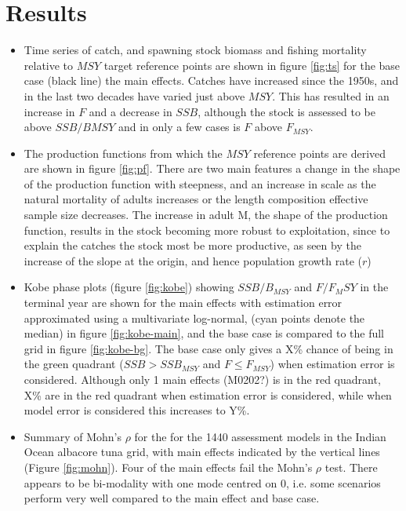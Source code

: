 \section*{Results}

\begin{itemize}
   \item Time series of catch, and spawning stock biomass and fishing mortality relative to $MSY$ target reference points are shown in figure \ref{fig:ts} for the base case (black line) the main effects. Catches have increased since the 1950s, and in the last two decades have varied just above $MSY$. This has resulted in an increase in $F$ and a decrease in $SSB$, although the stock is assessed to be above $SSB/B{MSY}$ and in only a few cases is $F$ above $F_{MSY}$.  

   \item The production functions from which the $MSY$ reference points are derived are shown in figure \ref{fig:pf}. There are two main features a change in the shape of the production function with steepness, and an increase in scale as the natural mortality of adults increases or the length composition effective sample size decreases. The increase in adult M, the shape of the production function, results in the stock becoming more robust to exploitation, since to explain the catches the stock most be more productive, as seen by the increase of the slope at the origin, and hence population growth rate ($r$)  

   \item Kobe phase plots (figure \ref{fig:kobe}) showing $SSB/B_{MSY}$ and $F/F_MSY$ in the terminal year are shown for the main effects with estimation error approximated using a multivariate log-normal, (cyan points denote the median) in figure \ref{fig:kobe-main}, and the base case is compared to the full grid in figure \ref{fig:kobe-bg}. The base case only gives a X\% chance of being in the green quadrant ($SSB \gt SSB_{MSY}$ and $F \le F_{MSY}$) when estimation error is considered. Although only 1 main effects (M0202?) is in the red quadrant, X\% are in the red quadrant when estimation error is considered, while when model error is considered this increases to Y\%. 
   
   \item Summary of Mohn's $\rho$ for the for the 1440 assessment models in the Indian Ocean albacore tuna grid, with main effects indicated by the vertical lines (Figure \ref{fig:mohn}). Four of the main effects fail the Mohn's $\rho$ test. There appears to be bi-modality with one mode centred on 0, i.e. some scenarios perform very well compared to the main effect and base case.
   

\end{itemize}
